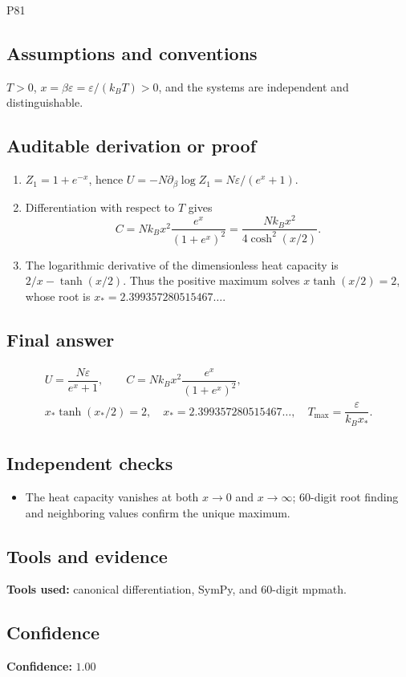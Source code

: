 \documentclass[11pt]{article}
\begin{document}
\begin{mprsolution}{P81}
\subsection*{Assumptions and conventions}
\(T>0\), \(x=\beta\varepsilon=\varepsilon/(k_BT)>0\), and the systems are
independent and distinguishable.
\subsection*{Auditable derivation or proof}
\begin{enumerate}[label=\textbf{Step \arabic*:},leftmargin=*]
\item \(Z_1=1+e^{-x}\), hence
\(U=-N\partial_\beta\log Z_1=N\varepsilon/(e^x+1)\).
\item Differentiation with respect to \(T\) gives
\[
C=Nk_Bx^2\frac{e^x}{(1+e^x)^2}
=\frac{Nk_Bx^2}{4\cosh^2(x/2)}.
\]
\item The logarithmic derivative of the dimensionless heat capacity is
\(2/x-\tanh(x/2)\).  Thus the positive maximum solves
\(x\tanh(x/2)=2\), whose root is
\(x_*=2.399357280515467\ldots\).
\end{enumerate}
\subsection*{Final answer}
\[
\boxed{\begin{gathered}
U=\dfrac{N\varepsilon}{e^x+1},\qquad
C=Nk_Bx^2\dfrac{e^x}{(1+e^x)^2},\\
x_*\tanh(x_*/2)=2,\quad x_*=2.399357280515467\ldots,\quad
T_{\max}=\dfrac{\varepsilon}{k_Bx_*}.
\end{gathered}}
\]
\subsection*{Independent checks}
\begin{itemize}[leftmargin=*]
\item The heat capacity vanishes at both \(x\to0\) and \(x\to\infty\);
60-digit root finding and neighboring values confirm the unique maximum.
\end{itemize}
\subsection*{Tools and evidence}
\textbf{Tools used:} canonical differentiation, SymPy, and 60-digit mpmath.
\subsection*{Confidence}
\textbf{Confidence:} \(1.00\)
\end{mprsolution}
\end{document}
